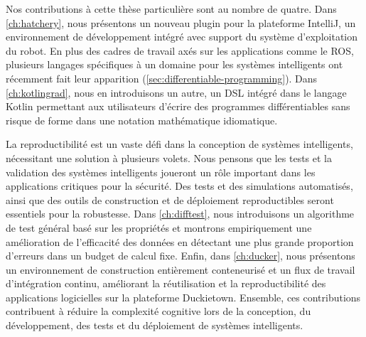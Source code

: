 Nos contributions à cette thèse particulière sont au nombre de quatre. Dans \autoref{ch:hatchery}, nous présentons un nouveau plugin pour la plateforme IntelliJ, un environnement de développement intégré avec support du système d'exploitation du robot. En plus des cadres de travail axés sur les applications comme le ROS, plusieurs langages spécifiques à un domaine pour les systèmes intelligents ont récemment fait leur apparition (\autoref{sec:differentiable-programming}). Dans \autoref{ch:kotlingrad}, nous en introduisons un autre, un DSL intégré dans le langage Kotlin permettant aux utilisateurs d'écrire des programmes différentiables sans risque de forme dans une notation mathématique idiomatique.

La reproductibilité est un vaste défi dans la conception de systèmes intelligents, nécessitant une solution à plusieurs volets. Nous pensons que les tests et la validation des systèmes intelligents joueront un rôle important dans les applications critiques pour la sécurité. Des tests et des simulations automatisés, ainsi que des outils de construction et de déploiement reproductibles seront essentiels pour la robustesse. Dans \autoref{ch:difftest}, nous introduisons un algorithme de test général basé sur les propriétés et montrons empiriquement une amélioration de l'efficacité des données en détectant une plus grande proportion d'erreurs dans un budget de calcul fixe. Enfin, dans \autoref{ch:ducker}, nous présentons un environnement de construction entièrement conteneurisé et un flux de travail d'intégration continu, améliorant la réutilisation et la reproductibilité des applications logicielles sur la plateforme Duckietown. Ensemble, ces contributions contribuent à réduire la complexité cognitive lors de la conception, du développement, des tests et du déploiement de systèmes intelligents.
